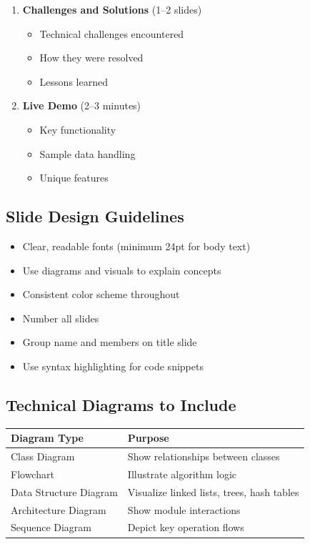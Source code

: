 \begin{enumerate}
  \item \textbf{Challenges and Solutions} (1--2 slides)
    \begin{itemize}
      \item Technical challenges encountered
      \item How they were resolved
      \item Lessons learned
    \end{itemize}

  \item \textbf{Live Demo} (2--3 minutes)
    \begin{itemize}
      \item Key functionality
      \item Sample data handling
      \item Unique features
    \end{itemize}
\end{enumerate}

\subsection{Slide Design Guidelines}

\begin{itemize}
  \item Clear, readable fonts (minimum 24pt for body text)
  \item Use diagrams and visuals to explain concepts
  \item Consistent color scheme throughout
  \item Number all slides
  \item Group name and members on title slide
  \item Use syntax highlighting for code snippets
\end{itemize}

\subsection{Technical Diagrams to Include}

\begin{center}
\begin{tabular}{l l}
\hline
\rowcolor{tableheader} \textbf{Diagram Type} & \textbf{Purpose} \\
\hline
Class Diagram & Show relationships between classes \\
Flowchart & Illustrate algorithm logic \\
Data Structure Diagram & Visualize linked lists, trees, hash tables \\
Architecture Diagram & Show module interactions \\
Sequence Diagram & Depict key operation flows \\
\hline
\end{tabular}
\end{center}

